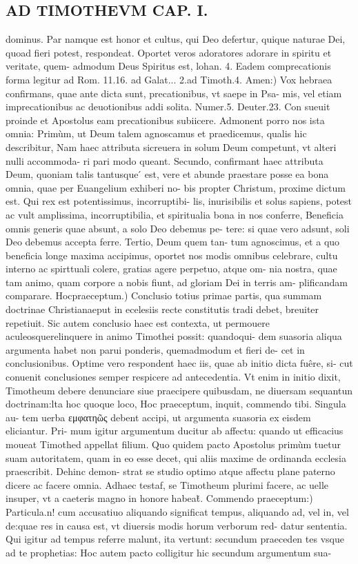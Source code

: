 \documentclass{article}
\begin{document}
\begin{pages}
\section*{AD TIMOTHEVM CAP. I. }
\marginpar{[ p.59 ]}\pstart dominus. Par namque  est honor et cultus, qui Deo defertur, quique  naturae Dei, quoad fieri potest, respondeat. Oportet veros adoratores adorare in spiritu et veritate, quem- admodum Deus Spiritus est, lohan. 4. Eadem comprecationis forma legitur ad Rom. 11.16. ad Galat... 2.ad Timoth.4.  \pend\pstart Amen:) Vox hebraea confirmans, quae ante dicta sunt, precationibus, vt saepe in Psa- mis, vel etiam imprecationibus ac deuotionibus addi solita. Numer.5. Deuter.23. Con sueuit proinde et Apostolus eam precationibus subiicere. Admonent porro nos ista omnia: Primùm, ut Deum talem agnoscamus et praedicemus, qualis hic describitur, Nam haec attributa sicreuera in solum Deum competunt, vt alteri nulli accommoda- ri pari modo queant. Secundo, confirmant haec attributa Deum, quoniam talis tantusque ́ est, vere et abunde praestare posse ea bona omnia, quae per Euangelium exhiberi no- bis propter Christum, proxime dictum est. Qui rex est potentissimus, incorruptibi- lis, inurisibilis et solus sapiens, potest ac vult amplissima, incorruptibilia, et spiritualia bona in nos conferre, Beneficia omnis generis quae absunt, a solo Deo debemus pe- tere: si quae vero adsunt, soli Deo debemus accepta ferre. Tertio, Deum quem tan- tum agnoscimus, et a quo beneficia longe maxima accipimus, oportet nos modis omnibus celebrare, cultu interno ac spirttuali colere, gratias agere perpetuo, atque  om- nia nostra, quae tam animo, quam corpore a nobis fiunt, ad gloriam Dei in terris am- plificandam comparare.  \pend\pstart Hocpraeceptum.) Conclusio totius primae partis, qua summam doctrinae Christianaeput in ecelesiis recte constitutis tradi debet, breuiter repetiuit. Sic autem conclusio haec est contexta, ut permouere aculeosquerelinquere in animo Timothei possit: quandoqui- dem suasoria aliqua argumenta habet non parui ponderis, quemadmodum et fieri de- cet in conclusionibus. Optime vero respondent haec iis, quae ab initio dicta fuêre, si- cut conuenit conclusiones semper respicere ad antecedentia. Vt enim in initio dixit, Timotheum debere denunciare siue praecipere quibusdam, ne diuersam sequantun doctrinam:lta hoc quoque  loco, Hoc praeceptum, inquit, commendo tibi. Singula au- tem uerba εμφατηῶς debent accipi, ut argumenta suasoria ex eisdem eliciantur. Pri- mum igitur argumentum ducitur ab affectu: quando ut efficacius moueat Timothed appellat filium. Quo quidem pacto Apostolus primùm tuetur suam autoritatem, quam in eo esse decet, qui aliis maxime de ordinanda ecclesia praescribit. Dehinc demon- strat se studio optimo atque  affectu plane paterno dicere ac facere omnia. Adhaec testaf, se Timotheum plurimi facere, ac uelle insuper, vt a caeteris magno in honore habeat̃.  \pend\pstart Commendo praeceptum:) Particula.n! cum accusatiuo aliquando significat tempus, aliquando ad, vel in, vel de:quae res in causa est, vt diuersis modis horum verborum red- datur sententia. Qui igitur ad tempus referre malunt, ita vertunt: secundum praeceden tes vsque  ad te prophetias: Hoc autem pacto colligitur hic secundum argumentum sua- 
\end{pages}
\end{document}

